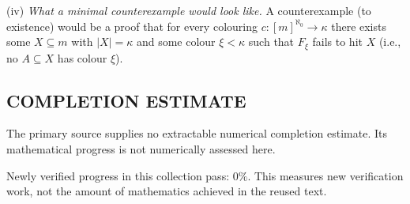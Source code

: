 (iv) \emph{What a minimal counterexample would look like.} A counterexample (to existence) would be a proof that for every colouring $c:[m]^{\aleph_0}\to\kappa$ there exists some $X\subseteq m$ with $|X|=\kappa$ and some colour $\xi<\kappa$ such that $F_{\xi}$ fails to hit $X$ (i.e., no $A\subseteq X$ has colour $\xi$).




\subsection*{COMPLETION ESTIMATE}
The primary source supplies no extractable numerical completion estimate. Its mathematical progress is not numerically assessed here.

Newly verified progress in this collection pass: $0\%$. This measures new verification work, not the amount of mathematics achieved in the reused text.
